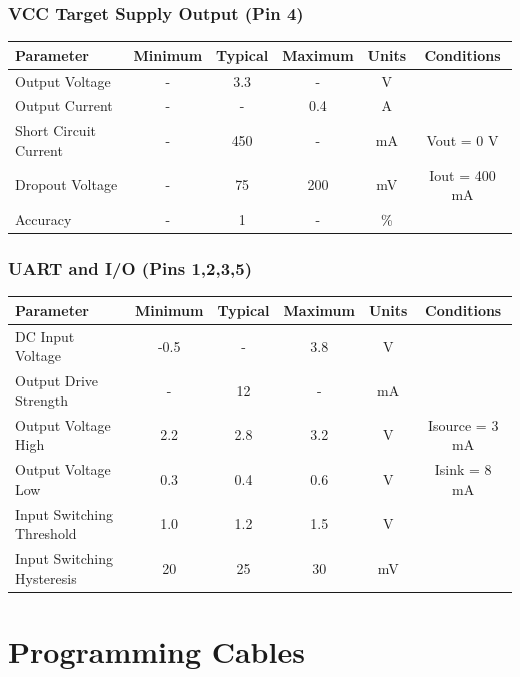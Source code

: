 \documentclass[10pt,letterpaper]{datasheet}
\begin{document}
\begin{flushleft}
    \subsubsection*{VCC Target Supply Output (Pin 4)}
    \label{tab:elec-sup}
    \begin{tabular}{|l|c|c|c|c|c|}
      \hline
      Parameter &
      Minimum &
      Typical &
      Maximum &
      Units &
      Conditions \\
      \hline
      Output Voltage & - & 3.3 & - & V & \\
      Output Current & - & - & 0.4 & A & \\
      Short Circuit Current & - & 450 & - & mA & Vout = 0 V \\
      Dropout Voltage & - & 75 & 200 & mV & Iout = 400 mA \\
      Accuracy & - & 1 & - & \% & \\
      \hline
    \end{tabular}
  
    \subsubsection*{UART and I/O (Pins 1,2,3,5)}
    \label{tab:elec-io}
    \begin{tabular}{|l|c|c|c|c|c|}
      \hline
      Parameter &
      Minimum &
      Typical &
      Maximum &
      Units &
      Conditions \\
      \hline
      DC Input Voltage & -0.5 & - & 3.8 & V & \\
      Output Drive Strength & - & 12 & - & mA & \\
      Output Voltage High & 2.2 & 2.8 & 3.2 & V & Isource = 3 mA \\
      Output Voltage Low & 0.3 & 0.4 & 0.6 & V & Isink = 8 mA \\
      Input Switching Threshold & 1.0 & 1.2 & 1.5 & V & \\
      Input Switching Hysteresis & 20 & 25 & 30 & mV & \\
      \hline
    \end{tabular}
\end{flushleft}
  
\newpage
  
\section*{Programming Cables}
\end{document}
